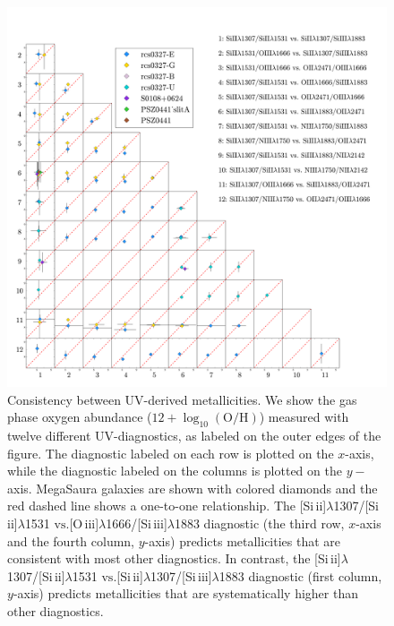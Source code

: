 \documentclass[preprint2]{aastex62}
\newcommand{\oiii}{[O\,{\sc iii}]\xspace}
\newcommand{\SiuII}{[Si\,{\sc ii}]\xspace}
\newcommand{\SiuIII}{[Si\,{\sc iii}]\xspace}
\newcommand\vs{\ensuremath{\mathrm{vs.}}\xspace}
\newcommand{\logten}{\ensuremath{\log_{10}}}
\newcommand{\logOH}{\ensuremath{\logten (\mathrm{O}/\mathrm{H})}\xspace}
\newcommand{\mage}{{\sc Meg}a{\sc S}a{\sc ura}\xspace}
\begin{document}
\begin{figure}
  \begin{center}
    \includegraphics[width=\linewidth]{figs/f6.png}
    \caption{Consistency between UV-derived metallicities. We show the gas phase oxygen abundance ($12+$\logOH) measured with twelve different UV-diagnostics, as labeled on the outer edges of the figure. The diagnostic labeled on each row is plotted on the $x$-axis, while the diagnostic labeled on the columns is plotted on the $y-$axis. \mage galaxies are shown with colored diamonds and the red dashed line shows a one-to-one relationship. The \SiuII$\lambda$1307/\SiuII$\lambda$1531 \vs \oiii$\lambda$1666/\SiuIII$\lambda$1883 diagnostic (the third row, $x$-axis and the fourth column, $y$-axis) predicts metallicities that are consistent with most other diagnostics. In contrast, the \SiuII$\lambda$1307/\SiuII$\lambda$1531 \vs \SiuII$\lambda$1307/\SiuIII$\lambda$1883 diagnostic (first column, $y$-axis) predicts metallicities that are systematically higher than other diagnostics.}
    \label{fig:UVUV}
  \end{center}
\end{figure}
\end{document}

